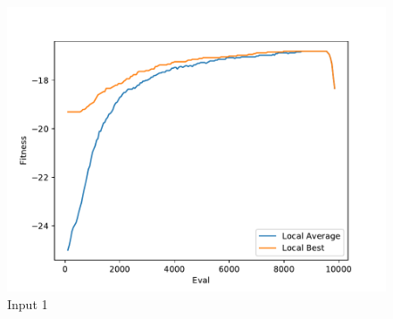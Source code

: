 \documentclass{standalone}
\begin{document}
\begin{figure}[!htb]
	\caption{Input 1}
	\label{fig:graph_1056}
	\includegraphics[width=\textwidth]{../graphs/graphs/1056.pdf}
\end{figure}
\end{document}
